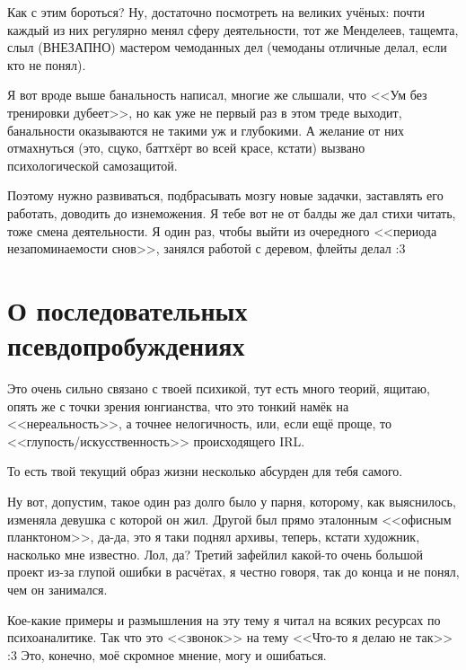 \documentclass[a4paper,14pt,oneside]{memoir}
\begin{document}
Как с этим бороться? Ну, достаточно посмотреть на великих учёных: почти каждый из них регулярно менял сферу деятельности, тот же Менделеев, тащемта, слыл (ВНЕЗАПНО) мастером чемоданных дел (чемоданы отличные делал, если кто не понял). 

Я вот вроде выше банальность написал, многие же слышали, что <<Ум без тренировки дубеет>>, но как уже не первый раз в этом треде выходит, банальности оказываются не такими уж и глубокими. А желание от них отмахнуться (это, сцуко, баттхёрт во всей красе, кстати) вызвано психологической самозащитой. 

Поэтому нужно развиваться, подбрасывать мозгу новые задачки, заставлять его работать, доводить до изнеможения. Я тебе вот не от балды же дал стихи читать, тоже смена деятельности. 
Я один раз, чтобы выйти из очередного <<периода незапоминаемости снов>>, занялся работой с деревом, флейты делал :3





\section{О последовательных псевдопробуждениях}

\medskip
Это очень сильно связано с твоей психикой, тут есть много теорий, ящитаю, опять же с точки зрения юнгианства, что это тонкий намёк на <<нереальность>>, а точнее нелогичность, или, если ещё проще, то <<глупость/ис\-кусс\-твенн\-ость>> происходящего IRL. 

То есть твой текущий образ жизни несколько абсурден для тебя самого. 

Ну вот, допустим, такое один раз долго было у парня, которому, как выяснилось, изменяла девушка с которой он жил. Другой был прямо эталонным <<офисным планктоном>>, да-да, это я таки поднял архивы, теперь, кстати художник, насколько мне известно. Лол, да? Третий зафейлил какой-то очень большой проект из-за глупой ошибки в расчётах, я честно говоря, так до конца и не понял, чем он занимался. 

Кое-какие примеры и размышления на эту тему я читал на всяких ресурсах по психоаналитике. Так что это <<звонок>> на тему <<Что-то я делаю не так>> :3 Это, конечно, моё скромное мнение, могу и ошибаться. 
\end{document}
